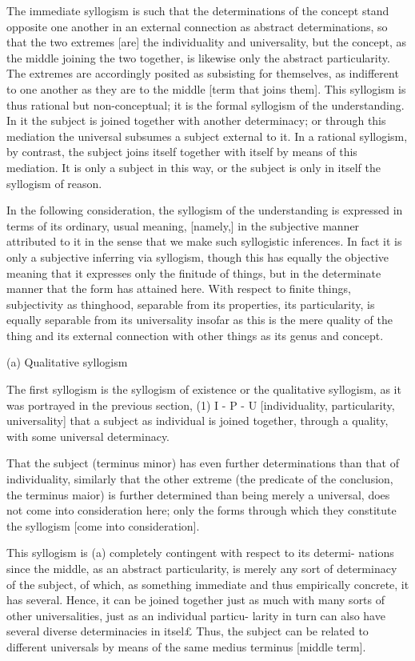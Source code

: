 The immediate syllogism is such that
the determinations of the concept stand opposite one another
in an external connection as abstract determinations,
so that the two extremes [are] the individuality and universality,
but the concept, as the middle joining the two together,
is likewise only the abstract particularity.
The extremes are accordingly posited
as subsisting for themselves,
as indifferent to one another as
they are to the middle [term that joins them].
This syllogism is thus rational but non-conceptual;
it is the formal syllogism of the understanding.
In it the subject is joined together with another determinacy;
or through this mediation the universal subsumes a subject external to it.
In a rational syllogism, by contrast, the subject joins itself
together with itself by means of this mediation.
It is only a subject in this way,
or the subject is only in itself
the syllogism of reason.

In the following consideration,
the syllogism of the understanding is expressed
in terms of its ordinary, usual meaning, [namely,]
in the subjective manner attributed to it
in the sense that we make such syllogistic inferences.
In fact it is only a subjective inferring via syllogism,
though this has equally the objective meaning
that it expresses only the finitude of things,
but in the determinate manner that the form has attained here.
With respect to finite things, subjectivity as thinghood,
separable from its properties, its particularity, is
equally separable from its universality insofar as this is
the mere quality of the thing
and its external connection with other things
as its genus and concept.

(a) Qualitative syllogism

The first syllogism is the syllogism of existence
or the qualitative syllogism,
as it was portrayed in the previous section,
(1) I - P - U
[individuality, particularity, universality]
that a subject as individual is joined together, through a quality,
with some universal determinacy.

That the subject (terminus minor) has even further determinations than
that of individuality, similarly that the other extreme
(the predicate of the conclusion, the terminus maior) is
further determined than being merely a universal,
does not come into consideration here;
only the forms through which they constitute the syllogism [come into consideration].

This syllogism is (a) completely contingent with respect to its determi-
nations since the middle, as an abstract particularity, is merely any sort of
determinacy of the subject, of which, as something immediate and thus
empirically concrete, it has several. Hence, it can be joined together just as
much with many sorts of other universalities, just as an individual particu-
larity in turn can also have several diverse determinacies in itsel£ Thus, the
subject can be related to different universals by means of the same medius
terminus [middle term].

